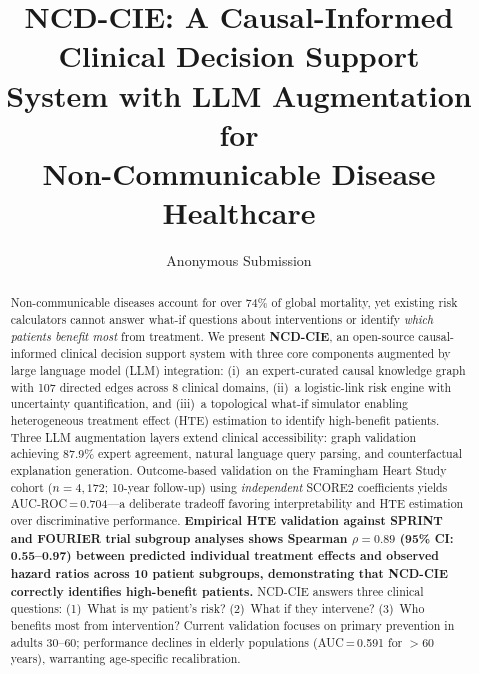\documentclass[runningheads]{llncs}
\begin{document}
\title{NCD-CIE: A Causal-Informed Clinical Decision Support\\System with LLM Augmentation for\\Non-Communicable Disease Healthcare}

\author{Anonymous Submission}

\maketitle

\begin{abstract}
Non-communicable diseases account for over 74\% of global mortality,
yet existing risk calculators cannot answer what-if questions about
interventions or identify \emph{which patients benefit most} from
treatment.
We present \textbf{NCD-CIE}, an open-source causal-informed clinical
decision support system with three core components augmented by large
language model (LLM) integration:
(i)~an expert-curated causal knowledge graph with 107 directed edges
across 8 clinical domains,
(ii)~a logistic-link risk engine with uncertainty quantification, and
(iii)~a topological what-if simulator enabling heterogeneous treatment
effect (HTE) estimation to identify high-benefit patients.
Three LLM augmentation layers extend clinical accessibility:
graph validation achieving 87.9\% expert agreement,
natural language query parsing, and
counterfactual explanation generation.
Outcome-based validation on the Framingham Heart Study cohort
($n\!=\!4{,}172$; 10-year follow-up) using \emph{independent} SCORE2
coefficients yields AUC-ROC\,=\,0.704---a deliberate tradeoff
favoring interpretability and HTE estimation over discriminative
performance.
\textbf{Empirical HTE validation against SPRINT and FOURIER trial
subgroup analyses shows Spearman $\rho = 0.89$ (95\% CI: 0.55--0.97)
between predicted individual treatment effects and observed hazard
ratios across 10 patient subgroups, demonstrating that NCD-CIE
correctly identifies high-benefit patients.}
NCD-CIE answers three clinical questions: (1)~What is my patient's
risk? (2)~What if they intervene? (3)~Who benefits most from
intervention?
Current validation focuses on primary prevention in adults 30--60;
performance declines in elderly populations (AUC\,=\,0.591 for
$>$60\,years), warranting age-specific recalibration.

\end{abstract}
\end{document}
